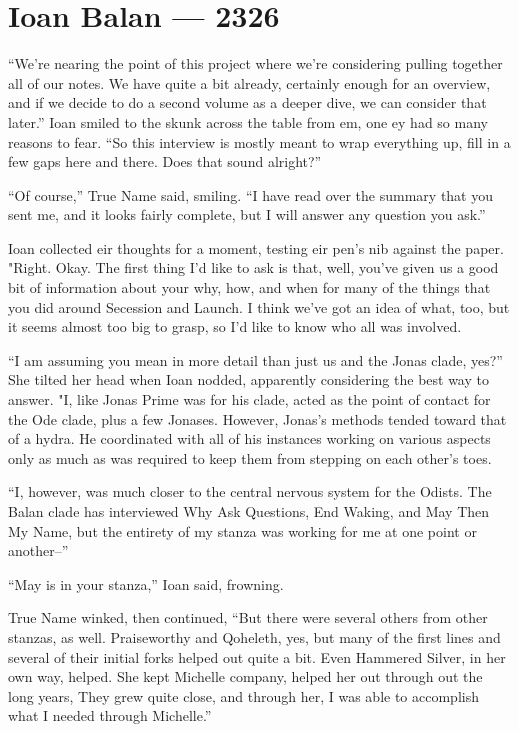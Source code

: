 \hypertarget{ioan-balan-2326}{%
\chapter{Ioan Balan — 2326}\label{ioan-balan-2326}}

``We're nearing the point of this project where we're considering pulling together all of our notes. We have quite a bit already, certainly enough for an overview, and if we decide to do a second volume as a deeper dive, we can consider that later.'' Ioan smiled to the skunk across the table from em, one ey had so many reasons to fear. ``So this interview is mostly meant to wrap everything up, fill in a few gaps here and there. Does that sound alright?''

``Of course,'' True Name said, smiling. ``I have read over the summary that you sent me, and it looks fairly complete, but I will answer any question you ask.''

Ioan collected eir thoughts for a moment, testing eir pen's nib against the paper. "Right. Okay. The first thing I'd like to ask is that, well, you've given us a good bit of information about your why, how, and when for many of the things that you did around Secession and Launch. I think we've got an idea of what, too, but it seems almost too big to grasp, so I'd like to know who all was involved.

``I am assuming you mean in more detail than just us and the Jonas clade, yes?'' She tilted her head when Ioan nodded, apparently considering the best way to answer. "I, like Jonas Prime was for his clade, acted as the point of contact for the Ode clade, plus a few Jonases. However, Jonas's methods tended toward that of a hydra. He coordinated with all of his instances working on various aspects only as much as was required to keep them from stepping on each other's toes.

``I, however, was much closer to the central nervous system for the Odists. The Balan clade has interviewed Why Ask Questions, End Waking, and May Then My Name, but the entirety of my stanza was working for me at one point or another--''

``May is in your stanza,'' Ioan said, frowning.

True Name winked, then continued, ``But there were several others from other stanzas, as well. Praiseworthy and Qoheleth, yes, but many of the first lines and several of their initial forks helped out quite a bit. Even Hammered Silver, in her own way, helped. She kept Michelle company, helped her out through out the long years, They grew quite close, and through her, I was able to accomplish what I needed through Michelle.''

